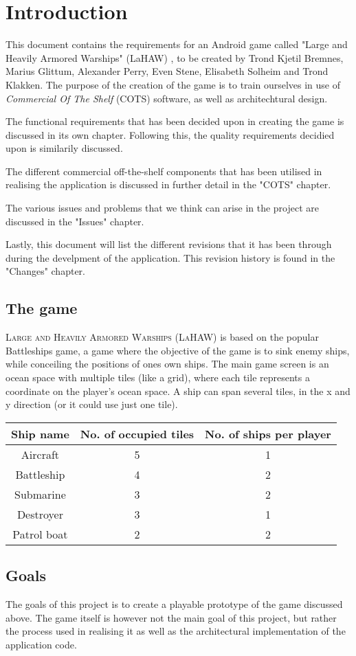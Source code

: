 \chapter{Introduction}
This document contains the requirements for an Android game called "Large and Heavily Armored Warships" (LaHAW) , to be created by Trond Kjetil Bremnes, Marius Glittum, Alexander Perry, Even Stene, Elisabeth Solheim and Trond Klakken. The purpose of the creation of the game is to train ourselves in use of \emph{Commercial Of The Shelf} (COTS) software, as well as architechtural design.

The functional requirements that has been decided upon in creating the game is discussed in its own chapter. Following this, the quality requirements decidied upon is similarily discussed.

The different commercial off-the-shelf components that has been utilised in realising the application is discussed in further detail in the "COTS" chapter.

The various issues and problems that we think can arise in the project are discussed in the "Issues" chapter.

Lastly, this document will list the different revisions that it has been through during the develpment of the application. This revision history is found in the "Changes" chapter.



\section{The game}
\textsc{Large and Heavily Armored Warships (LaHAW)} is based on the popular Battleships\cite{battleship} game, a game where the objective of the game is to sink enemy ships, while conceiling the positions of ones own ships. The main game screen is an ocean space with multiple tiles (like a grid), where each tile represents a coordinate on the player's ocean space. A ship can span several tiles, in the x and y direction (or it could use just one tile). 
\\


\begin{tabular}{| c | c | c |}
    \hline
    \rowcolor[gray]{0.8}
    \hspace{0.3cm}\textbf{Ship name}\hspace{0.3cm} & \textbf{No. of occupied tiles} & \textbf{No. of ships per player} \\
    \hline
    Aircraft & 5 & 1 \\
    Battleship & 4 & 2 \\
    Submarine & 3 & 2 \\
    Destroyer & 3 & 1 \\
    Patrol boat & 2 & 2 \\
    \hline
\end{tabular}
\label{shiptable}





\section{Goals}
The goals of this project is to create a playable prototype of the game discussed above. The game itself is however not the main goal of this project, but rather the process used in realising it as well as the architectural implementation of the application code.

